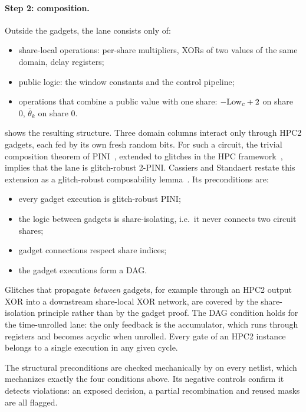\paragraph{Step 2: composition.}
Outside the gadgets, the lane consists only of:
\begin{itemize}
  \item share-local operations: per-share multipliers, XORs of two values of the same domain, delay registers;
  \item public logic: the window constants and the control pipeline;
  \item operations that combine a public value with one share: $-\mathrm{Low}_c + 2$ on share 0, $\bar\theta_k$ on share 0.
\end{itemize}
 shows the resulting structure. Three domain columns interact only through HPC2 gadgets, each fed by its own fresh random bits. For such a circuit, the trivial composition theorem of PINI~\cite{cassiers2020pini}, extended to glitches in the HPC framework~\cite{cassiers2021hpc}, implies that the lane is glitch-robust 2-PINI. Cassiers and Standaert restate this extension as a glitch-robust composability lemma~\cite[Lemma~1]{cassiers2021trans}. Its preconditions are:
\begin{itemize}
  \item every gadget execution is glitch-robust PINI;
  \item the logic between gadgets is share-isolating, i.e.\ it never connects two circuit shares;
  \item gadget connections respect share indices;
  \item the gadget executions form a DAG.
\end{itemize}
Glitches that propagate \emph{between} gadgets, for example through an HPC2 output XOR into a downstream share-local XOR network, are covered by the share-isolation principle rather than by the gadget proof. The DAG condition holds for the time-unrolled lane: the only feedback is the accumulator, which runs through registers and becomes acyclic when unrolled. Every gate of an HPC2 instance belongs to a single execution in any given cycle.

The structural preconditions are checked mechanically by  on every netlist, which mechanizes exactly the four conditions above. Its negative controls confirm it detects violations: an exposed decision, a partial recombination and reused masks are all flagged.

